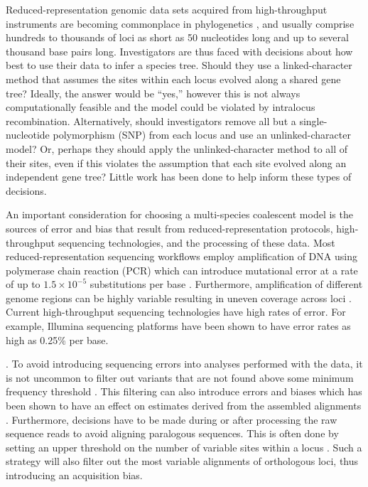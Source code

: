 Reduced-representation genomic data sets acquired from high-throughput
instruments are becoming commonplace in phylogenetics \citep{Leache2017}, and
usually comprise hundreds to thousands of loci as short as 50 nucleotides long
and up to several thousand base pairs long.
Investigators are thus faced with decisions about how best to 
use their data to infer a species tree.
Should they use a linked-character method that assumes the sites within each
locus evolved along a shared gene tree?
Ideally, the answer would be ``yes,'' however this is not always
computationally feasible and the model could be violated by intralocus
recombination.
Alternatively, should investigators remove all but a single-nucleotide
polymorphism (SNP) from each locus and use an unlinked-character model?
Or, perhaps they should apply the unlinked-character method to all of their
sites, even if this violates the assumption that each site evolved along an
independent gene tree?
Little work has been done to help inform these types of decisions. 

An important consideration for choosing a multi-species coalescent model is
the sources of error and bias that result from reduced-representation protocols,
high-throughput sequencing technologies, and the processing of these data.
Most reduced-representation sequencing workflows employ amplification of DNA  
using polymerase chain reaction (PCR) which can introduce mutational error at a 
rate of up to $1.5\times10^{-5}$ substitutions per base \citep{potapovExaminingSourcesError2017}.
Furthermore, amplification of different genome regions can be highly variable 
resulting in uneven coverage across loci \citep{airdAnalyzingMinimizingPCR2011}. 
Current high-throughput sequencing technologies have high rates of error.
For example, Illumina sequencing platforms have been shown to have error rates
as high as 0.25\% per base. 



\citep{pfeifferSystematicEvaluationError2018}. 
To avoid introducing sequencing errors into analyses performed with the data, it is not 
uncommon to filter out variants that are not found above some minimum frequency 
threshold \citep{rochetteStacksAnalyticalMethods2019, linckMinorAlleleFrequency2019}. 
This filtering can also introduce errors and biases which has been 
shown to have an effect on estimates derived from the assembled alignments
\citep{Harvey2015,linckMinorAlleleFrequency2019}.
Furthermore, decisions have to be made during or after processing
the raw sequence reads to avoid aligning paralogous sequences.
This is often done by setting an upper threshold on the number of variable
sites within a locus \citep{harveySimilarityThresholdsUsed2015}. 
Such a strategy will also filter out the most variable alignments
of orthologous loci, thus introducing an acquisition bias.



